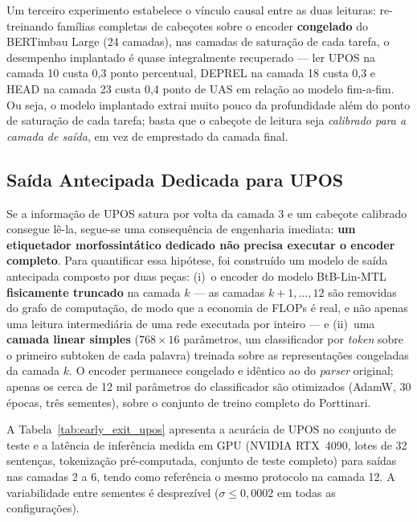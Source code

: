 Um terceiro experimento estabelece o vínculo causal entre as duas leituras: re-treinando
famílias completas de cabeçotes sobre o encoder \textbf{congelado} do BERTimbau Large (24
camadas), nas camadas de saturação de cada tarefa, o desempenho implantado é quase integralmente
recuperado --- ler UPOS na camada 10 custa 0,3 ponto percentual, DEPREL na camada 18 custa 0,3 e
HEAD na camada 23 custa 0,4 ponto de UAS em relação ao modelo fim-a-fim. Ou seja, o modelo
implantado extrai muito pouco da profundidade além do ponto de saturação de cada tarefa; basta
que o cabeçote de leitura seja \emph{calibrado para a camada de saída}, em vez de emprestado da
camada final.

\subsection{Saída Antecipada Dedicada para UPOS}
\label{subsec:early_exit_upos}

Se a informação de UPOS satura por volta da camada 3 e um cabeçote calibrado consegue lê-la,
segue-se uma consequência de engenharia imediata: \textbf{um etiquetador morfossintático
dedicado não precisa executar o encoder completo}. Para quantificar essa hipótese, foi
construído um modelo de saída antecipada composto por duas peças: (i)~o encoder do modelo
BtB-Lin-MTL \textbf{fisicamente truncado} na camada $k$ --- as camadas $k{+}1, \dots, 12$ são
removidas do grafo de computação, de modo que a economia de FLOPs é real, e não apenas uma
leitura intermediária de uma rede executada por inteiro --- e (ii)~uma \textbf{camada linear
simples} ($768 \times 16$ parâmetros, um classificador por \textit{token} sobre o primeiro
subtoken de cada palavra) treinada sobre as representações congeladas da camada $k$. O encoder
permanece congelado e idêntico ao do \textit{parser} original; apenas os cerca de 12 mil
parâmetros do classificador são otimizados (AdamW, 30 épocas, três sementes), sobre o conjunto
de treino completo do Porttinari.

A Tabela~\ref{tab:early_exit_upos} apresenta a acurácia de UPOS no conjunto de teste e a
latência de inferência medida em GPU (NVIDIA RTX~4090, lotes de 32 sentenças, tokenização
pré-computada, conjunto de teste completo) para saídas nas camadas 2 a 6, tendo como referência
o mesmo protocolo na camada 12. A variabilidade entre sementes é desprezível
($\sigma \leq 0{,}0002$ em todas as configurações).


